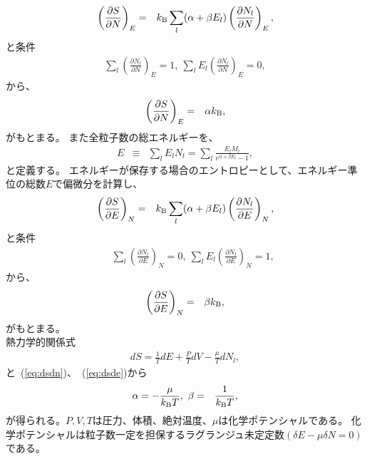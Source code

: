 \documentclass[12pt,a4paper]{jbook}
\newcommand{\kb} {k_{\rm B}}				%
\begin{document}
		\begin{eqnarray}
			\left( \frac{\partial S}{\partial N} \right)_E & = &
			\kb \sum_l (\alpha + \beta E_l) \left( \frac{\partial N_l}{\partial N} \right)_E,
		\end{eqnarray}
        と条件
		\begin{eqnarray}
			\sum_l \left( \frac{\partial N_l}{\partial N} \right)_E = 1,
			\ \sum_l E_l \left( \frac{\partial N_l}{\partial N} \right)_E = 0,
		\end{eqnarray}
        から、
		\begin{eqnarray}
            \label{eq:dsdn}
			\left( \frac{\partial S}{\partial N} \right)_E & = & \alpha \kb,
		\end{eqnarray}
        がもとまる。
        また全粒子数の総エネルギーを、
		\begin{eqnarray}
			E & \equiv & \sum_l E_l N_l = \sum_l \frac{E_l M_l}{e^{\alpha + \beta E_l} -1},
		\end{eqnarray}
        と定義する。
        エネルギーが保存する場合のエントロピーとして、エネルギー準位の総数$E$で偏微分を計算し、
		\begin{eqnarray}
			\left( \frac{\partial S}{\partial E} \right)_N & = &
			\kb \sum_l (\alpha + \beta E_l) \left( \frac{\partial N_l}{\partial E} \right)_N,
		\end{eqnarray}
        と条件
		\begin{eqnarray}
			& & \sum_l \left( \frac{\partial N_l}{\partial E} \right)_N = 0,
			\ \sum_l E_l \left( \frac{\partial N_l}{\partial E} \right)_N = 1,
		\end{eqnarray}
        から、
		\begin{eqnarray}
            \label{eq:dsde}
			\left( \frac{\partial S}{\partial E} \right)_N & = & \beta \kb,
		\end{eqnarray}
        がもとまる。
        \\
        熱力学的関係式
        \begin{eqnarray}
        dS = \frac{1}{T}dE + \frac{P}{T}dV - \frac{\mu}{T} dN_l,
        \end{eqnarray}
        と~(\ref{eq:dsdn})、~(\ref{eq:dsde})から
		\begin{eqnarray}
            \label{eq:alphabeta}
			\alpha = - \frac{\mu}{{\kb} T}
			, \ \beta & = & \frac{1}{{\kb} T},
		\end{eqnarray}
        が得られる。$P,V,T$は圧力、体積、絶対温度、$\mu$は化学ポテンシャルである。
        化学ポテンシャルは粒子数一定を担保するラグランジュ未定定数$(\delta E - \mu \delta N = 0)$である。
\end{document}
